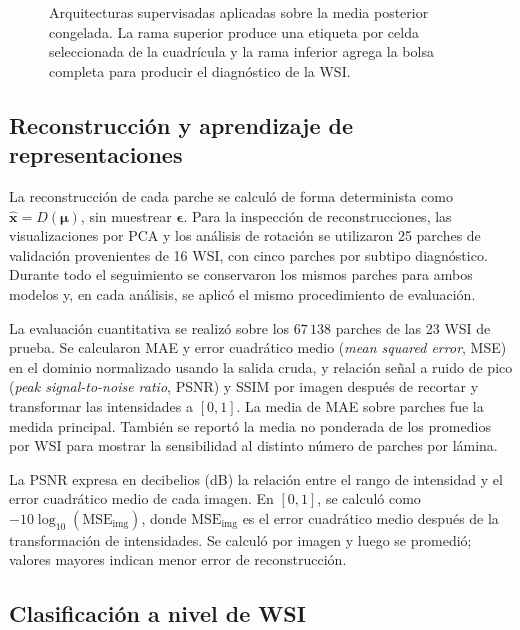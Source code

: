 \begin{figure}[htbp]
    \centering
    \resizebox{\textwidth}{!}{}
    \caption{Arquitecturas supervisadas aplicadas sobre la media posterior
    congelada. La rama superior produce una etiqueta por celda seleccionada de
    la cuadrícula y la rama inferior agrega la bolsa completa para producir el
    diagnóstico de la WSI.}
    \label{fig:arquitecturas-supervisadas}
\end{figure}
\FloatBarrier

\subsection{Reconstrucción y aprendizaje de representaciones}

La reconstrucción de cada parche se calculó de forma determinista como
\(\widehat{\mathbf{x}}=D(\boldsymbol{\mu})\), sin muestrear
\(\boldsymbol{\epsilon}\). Para la inspección de reconstrucciones, las
visualizaciones por PCA y los análisis de rotación se utilizaron 25 parches
de validación provenientes de 16 WSI, con cinco parches por subtipo
diagnóstico. Durante todo el seguimiento se conservaron los mismos parches
para ambos modelos y, en cada análisis, se aplicó el mismo procedimiento de
evaluación.

La evaluación cuantitativa se realizó sobre los \(67\,138\) parches de las 23
WSI de prueba. Se calcularon MAE y error cuadrático medio (\emph{mean
squared error}, MSE) en el dominio normalizado usando la salida cruda, y relación
señal a ruido de pico (\emph{peak signal-to-noise ratio}, PSNR) y SSIM por
imagen después de recortar y transformar las intensidades a
\([0,1]\). La media de MAE sobre parches fue la medida principal. También se
reportó la media no ponderada de los promedios por WSI para mostrar la
sensibilidad al distinto número de parches por lámina.

La PSNR expresa en decibelios (dB) la relación entre el rango de intensidad
y el error cuadrático medio de cada imagen. En \([0,1]\), se
calculó como \(-10\log_{10}(\mathrm{MSE}_{\mathrm{img}})\), donde
\(\mathrm{MSE}_{\mathrm{img}}\) es el error cuadrático medio después de la
transformación de intensidades. Se calculó por imagen y luego se promedió;
valores mayores indican menor error de reconstrucción.

\subsection{Clasificación a nivel de WSI}

